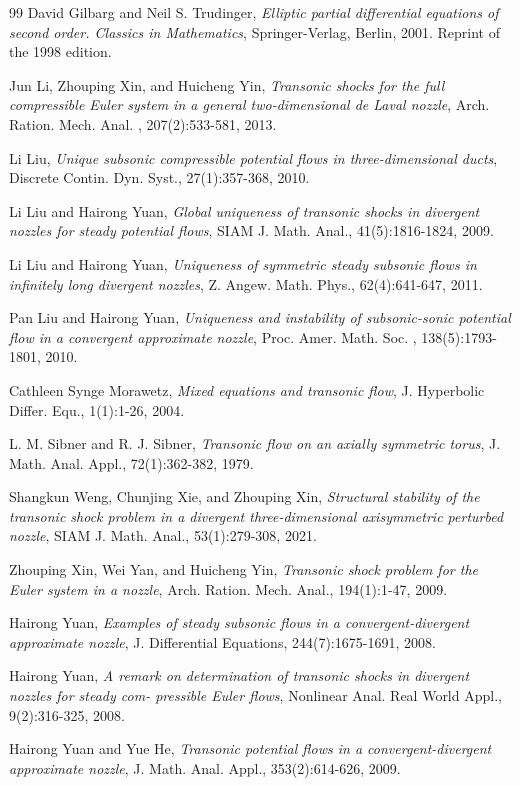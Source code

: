 \documentclass[reqno,12pt]{amsart}
\numberwithin{equation}{section}
\begin{document}
\begin{thebibliography}{99}
 David Gilbarg and Neil S. Trudinger,
\newblock  \emph{Elliptic partial differential equations  of second order. Classics in Mathematics},
\newblock Springer-Verlag, Berlin, 2001. Reprint of the 1998 edition.

 Jun Li, Zhouping Xin, and Huicheng Yin,
\newblock  \emph{Transonic shocks for the full compressible Euler system in a general two-dimensional de Laval nozzle},
\newblock Arch. Ration. Mech. Anal. , 207(2):533-581, 2013.

  Li Liu,
\newblock  \emph{Unique subsonic compressible potential flows in three-dimensional ducts},
\newblock Discrete  Contin. Dyn. Syst., 27(1):357-368, 2010.

  Li Liu and Hairong Yuan,
\newblock  \emph{Global uniqueness of transonic shocks in divergent nozzles for steady potential flows},
\newblock SIAM J. Math. Anal., 41(5):1816-1824, 2009.

 Li Liu and Hairong Yuan,
\newblock  \emph{Uniqueness of symmetric steady subsonic flows in infinitely long divergent nozzles},
\newblock Z. Angew. Math. Phys., 62(4):641-647, 2011.

 Pan Liu and Hairong Yuan,
\newblock  \emph{Uniqueness and instability of subsonic-sonic potential flow in a convergent approximate nozzle},
\newblock Proc. Amer. Math. Soc. , 138(5):1793-1801, 2010.

 Cathleen Synge Morawetz,
\newblock  \emph{Mixed equations and transonic flow},
\newblock J. Hyperbolic Differ. Equ., 1(1):1-26, 2004.

 L. M. Sibner and R. J. Sibner,
\newblock  \emph{Transonic flow on an axially symmetric torus},
\newblock J. Math. Anal. Appl., 72(1):362-382, 1979.

 Shangkun  Weng,  Chunjing  Xie,  and  Zhouping  Xin,
\newblock  \emph{Structural  stability  of  the  transonic  shock problem in a divergent three-dimensional axisymmetric perturbed nozzle},
\newblock SIAM  J.  Math.  Anal., 53(1):279-308, 2021.

 Zhouping Xin, Wei Yan,  and Huicheng Yin,
\newblock  \emph{Transonic shock problem for the Euler system in a nozzle},
\newblock Arch. Ration. Mech. Anal., 194(1):1-47, 2009.

 Hairong Yuan,
\newblock  \emph{Examples of steady subsonic flows in a convergent-divergent approximate nozzle},
\newblock J. Differential Equations, 244(7):1675-1691, 2008.

 Hairong Yuan,
\newblock  \emph{A remark on determination of transonic shocks in divergent nozzles for steady com- pressible Euler flows},
\newblock Nonlinear Anal. Real  World Appl., 9(2):316-325, 2008.

 Hairong Yuan and Yue He,
\newblock  \emph{Transonic potential flows in a convergent-divergent approximate nozzle},
\newblock J. Math. Anal. Appl., 353(2):614-626, 2009.

\end{thebibliography}
\end{document}
